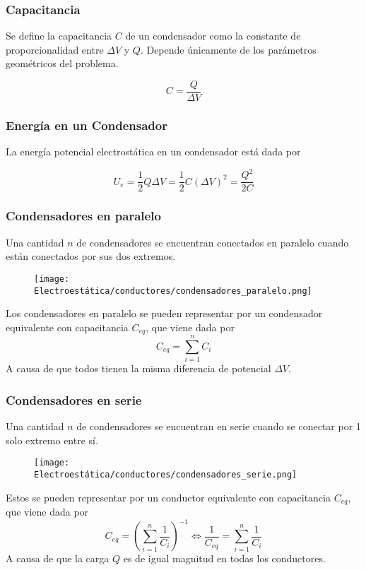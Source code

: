 \subsubsection{Capacitancia}

Se define la capacitancia $C$ de un condensador como la constante de proporcionalidad entre $\Delta V$ y $Q$. Depende únicamente de los parámetros geométricos del problema.

\[C=\frac{Q}{\Delta V}\]

\subsubsection{Energía en un Condensador}

La energía potencial electrostática en un condensador está dada por

\[U_e = \frac{1}{2}Q\Delta V = \frac{1}{2}C(\Delta V)^2=\frac{Q^2}{2C}\]

\subsubsection{Condensadores en paralelo}
Una cantidad $n$ de condensadores se encuentran conectados en paralelo cuando están conectados por sus dos extremos.
\begin{figure}[H]
    \centering
    \texttt{[image: Electroestática/conductores/condensadores\_paralelo.png]}
\end{figure}
Los condensadores en paralelo se pueden representar por un condensador equivalente con capacitancia $C_{eq}$, que viene dada por
\[C_{eq} = \sum_{i=1}^nC_i\]
A causa de que todos tienen la misma diferencia de potencial $\Delta V$.

\subsubsection{Condensadores en serie}
Una cantidad $n$ de condensadores se encuentran en serie cuando se conectar por 1 solo extremo entre sí.
\begin{figure}[H]
    \centering
    \texttt{[image: Electroestática/conductores/condensadores\_serie.png]}
\end{figure}
Estos se pueden representar por un conductor equivalente con capacitancia $C_{eq}$, que viene dada por
\[C_{eq} = \left( \sum_{i=1}^n\frac{1}{C_i} \right)^{-1} \iff \frac{1}{C_{eq}} =\sum_{i=1}^n\frac{1}{C_i} \]
A causa de que la carga $Q$ es de igual magnitud en todas los conductores.

\newpage